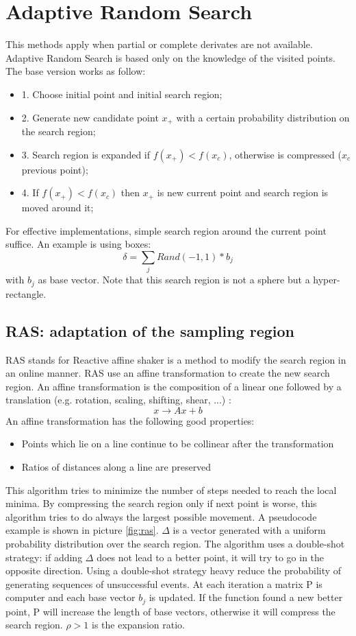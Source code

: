\documentclass[10pt]{article}
\begin{document}
\section{Adaptive Random Search}
This methods apply when partial or complete derivates are not available. Adaptive Random Search is based only on the knowledge of the visited points. The base version works as follow:
\begin{itemize}
\item{1. Choose initial point and initial search region;}
\item{2. Generate new candidate point $x_+$ with a certain probability distribution on the search region;}
\item{3. Search region is expanded if $f(x_+) < f(x_c)$, otherwise is compressed ($x_c$ previous point);}
\item{4. If $f(x_+) < f(x_c)$ then $x_+$ is new current point and search region is moved around it;}
\end{itemize}
For effective implementations, simple search region around the current point suffice. An example is using boxes: 
$$
\delta = \sum_{j} Rand(-1,1) * b_j
$$
 with $b_j$ as base vector. Note that this search region is not a sphere but a hyper-rectangle.

\subsection{RAS: adaptation of the sampling region}
RAS stands for Reactive affine shaker is a method to modify the search region in an online manner. RAS use an affine transformation to 
create the new search region. An affine transformation is the composition of a linear one followed by a translation (e.g. rotation, scaling, shifting, shear, ...) :
$$
x \rightarrow Ax + b
$$
An affine transformation has the following good properties:
\begin{itemize}
\item{Points which lie on a line continue to be collinear after the transformation}
\item{Ratios of distances along a line are preserved}
\end{itemize}

This algorithm tries to minimize the number of steps needed to reach the local minima. By compressing the search region only if next point is worse, this algorithm tries to do always the largest possible movement. A pseudocode example is shown in picture \ref{fig:ras}. $\Delta$ is a vector generated with a uniform probability distribution over the search region. The algorithm uses a double-shot strategy: if adding $\Delta$ does not lead to a better point, it will try to go in the opposite direction. Using a double-shot strategy heavy reduce the probability of generating sequences of unsuccessful events. At each iteration a matrix P is computer and each base vector $b_j$ is updated.
If the function found a new better point, P will increase the length of base vectors, otherwise it will compress the search region. $\rho > 1$ is the expansion ratio. 
\end{document}
